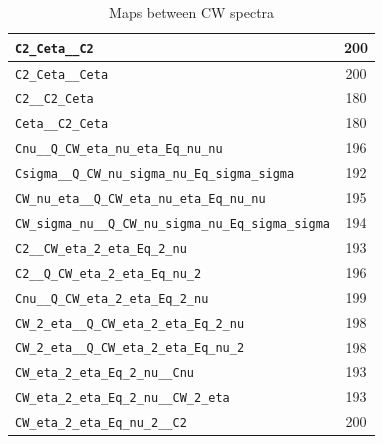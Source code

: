 \begin{table}
\begin{tabular}{|l|c|}
\texttt{C2\_Ceta\_\_C2} & 200\\\hline
\texttt{C2\_Ceta\_\_Ceta} & 200\\\hline
\texttt{C2\_\_C2\_Ceta} & 180\\\hline
\texttt{Ceta\_\_C2\_Ceta} & 180\\\hline
\texttt{Cnu\_\_Q\_CW\_eta\_nu\_eta\_Eq\_nu\_nu} & 196\\\hline
\texttt{Csigma\_\_Q\_CW\_nu\_sigma\_nu\_Eq\_sigma\_sigma} & 192\\\hline
\texttt{CW\_nu\_eta\_\_Q\_CW\_eta\_nu\_eta\_Eq\_nu\_nu} & 195\\\hline
\texttt{CW\_sigma\_nu\_\_Q\_CW\_nu\_sigma\_nu\_Eq\_sigma\_sigma} & 194\\\hline
\texttt{C2\_\_CW\_eta\_2\_eta\_Eq\_2\_nu} & 193\\\hline
\texttt{C2\_\_Q\_CW\_eta\_2\_eta\_Eq\_nu\_2} & 196\\\hline
\texttt{Cnu\_\_Q\_CW\_eta\_2\_eta\_Eq\_2\_nu} & 199\\\hline
\texttt{CW\_2\_eta\_\_Q\_CW\_eta\_2\_eta\_Eq\_2\_nu} & 198\\\hline
\texttt{CW\_2\_eta\_\_Q\_CW\_eta\_2\_eta\_Eq\_nu\_2} & 198\\\hline
\texttt{CW\_eta\_2\_eta\_Eq\_2\_nu\_\_Cnu} & 193\\\hline
\texttt{CW\_eta\_2\_eta\_Eq\_2\_nu\_\_CW\_2\_eta} & 193\\\hline
\texttt{CW\_eta\_2\_eta\_Eq\_nu\_2\_\_C2} & 200\\\hline
\end{tabular}\caption{Maps between CW spectra}
\end{table}

